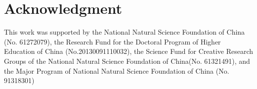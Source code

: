 \documentclass[conference]{IEEEtran}
\theoremstyle{definition}
\begin{document}


\section*{Acknowledgment}
This work was supported by the National Natural Science Foundation of China (No. 61272079), the Research Fund for the Doctoral Program of Higher Education of China (No.20130091110032), the Science Fund for Creative Research Groups of the National Natural Science Foundation of China(No. 61321491), and the Major Program of National Natural Science Foundation of China (No. 91318301)








%
%
%




\end{document}
